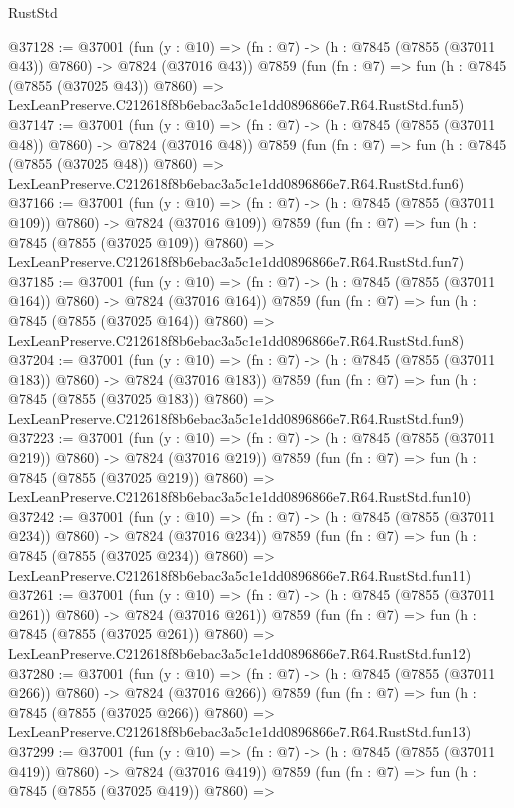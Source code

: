 \begin{lexlean}{RustStd}
\begin{coremodule}
@37128 := @37001
    (fun (y : @10) => (fn : @7) -> (h : @7845 (@7855 (@37011 @43)) @7860) -> @7824 (@37016 @43))
    @7859
    (fun (fn : @7) =>
    fun (h : @7845 (@7855 (@37025 @43)) @7860) =>
    LexLeanPreserve.C212618f8b6ebac3a5c1e1dd0896866e7.R64.RustStd.fun5)
@37147 := @37001
    (fun (y : @10) => (fn : @7) -> (h : @7845 (@7855 (@37011 @48)) @7860) -> @7824 (@37016 @48))
    @7859
    (fun (fn : @7) =>
    fun (h : @7845 (@7855 (@37025 @48)) @7860) =>
    LexLeanPreserve.C212618f8b6ebac3a5c1e1dd0896866e7.R64.RustStd.fun6)
@37166 := @37001
    (fun (y : @10) => (fn : @7) -> (h : @7845 (@7855 (@37011 @109)) @7860) -> @7824 (@37016 @109))
    @7859
    (fun (fn : @7) =>
    fun (h : @7845 (@7855 (@37025 @109)) @7860) =>
    LexLeanPreserve.C212618f8b6ebac3a5c1e1dd0896866e7.R64.RustStd.fun7)
@37185 := @37001
    (fun (y : @10) => (fn : @7) -> (h : @7845 (@7855 (@37011 @164)) @7860) -> @7824 (@37016 @164))
    @7859
    (fun (fn : @7) =>
    fun (h : @7845 (@7855 (@37025 @164)) @7860) =>
    LexLeanPreserve.C212618f8b6ebac3a5c1e1dd0896866e7.R64.RustStd.fun8)
@37204 := @37001
    (fun (y : @10) => (fn : @7) -> (h : @7845 (@7855 (@37011 @183)) @7860) -> @7824 (@37016 @183))
    @7859
    (fun (fn : @7) =>
    fun (h : @7845 (@7855 (@37025 @183)) @7860) =>
    LexLeanPreserve.C212618f8b6ebac3a5c1e1dd0896866e7.R64.RustStd.fun9)
@37223 := @37001
    (fun (y : @10) => (fn : @7) -> (h : @7845 (@7855 (@37011 @219)) @7860) -> @7824 (@37016 @219))
    @7859
    (fun (fn : @7) =>
    fun (h : @7845 (@7855 (@37025 @219)) @7860) =>
    LexLeanPreserve.C212618f8b6ebac3a5c1e1dd0896866e7.R64.RustStd.fun10)
@37242 := @37001
    (fun (y : @10) => (fn : @7) -> (h : @7845 (@7855 (@37011 @234)) @7860) -> @7824 (@37016 @234))
    @7859
    (fun (fn : @7) =>
    fun (h : @7845 (@7855 (@37025 @234)) @7860) =>
    LexLeanPreserve.C212618f8b6ebac3a5c1e1dd0896866e7.R64.RustStd.fun11)
@37261 := @37001
    (fun (y : @10) => (fn : @7) -> (h : @7845 (@7855 (@37011 @261)) @7860) -> @7824 (@37016 @261))
    @7859
    (fun (fn : @7) =>
    fun (h : @7845 (@7855 (@37025 @261)) @7860) =>
    LexLeanPreserve.C212618f8b6ebac3a5c1e1dd0896866e7.R64.RustStd.fun12)
@37280 := @37001
    (fun (y : @10) => (fn : @7) -> (h : @7845 (@7855 (@37011 @266)) @7860) -> @7824 (@37016 @266))
    @7859
    (fun (fn : @7) =>
    fun (h : @7845 (@7855 (@37025 @266)) @7860) =>
    LexLeanPreserve.C212618f8b6ebac3a5c1e1dd0896866e7.R64.RustStd.fun13)
@37299 := @37001
    (fun (y : @10) => (fn : @7) -> (h : @7845 (@7855 (@37011 @419)) @7860) -> @7824 (@37016 @419))
    @7859
    (fun (fn : @7) =>
    fun (h : @7845 (@7855 (@37025 @419)) @7860) =>

\end{coremodule}
\end{lexlean}
